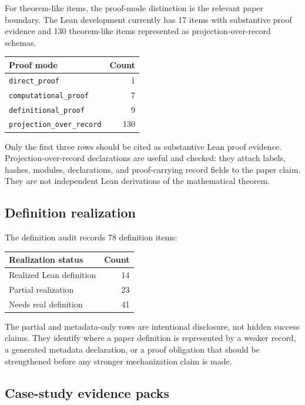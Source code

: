 \documentclass[11pt]{article}
\theoremstyle{definition}
\begin{document}
For theorem-like items, the proof-mode distinction is the relevant paper
boundary.  The Lean development currently has 17 items with substantive proof
evidence and 130 theorem-like items represented as projection-over-record
schemas.

\begin{center}
\begin{tabular}{@{}lr@{}}
\toprule
Proof mode & Count \\
\midrule
\texttt{direct\_proof} & 1 \\
\texttt{computational\_proof} & 7 \\
\texttt{definitional\_proof} & 9 \\
\texttt{projection\_over\_record} & 130 \\
\bottomrule
\end{tabular}
\end{center}

Only the first three rows should be cited as substantive Lean proof evidence.
Projection-over-record declarations are useful and checked: they attach labels,
hashes, modules, declarations, and proof-carrying record fields to the paper
claim.  They are not independent Lean derivations of the mathematical theorem.

\subsection{Definition realization}

The definition audit records 78 definition items:

\begin{center}
\begin{tabular}{@{}lr@{}}
\toprule
Realization status & Count \\
\midrule
Realized Lean definition & 14 \\
Partial realization & 23 \\
Needs real definition & 41 \\
\bottomrule
\end{tabular}
\end{center}

The partial and metadata-only rows are intentional disclosure, not hidden
success claims.  They identify where a paper definition is represented by a
weaker record, a generated metadata declaration, or a proof obligation that
should be strengthened before any stronger mechanization claim is made.

\subsection{Case-study evidence packs}
\end{document}
